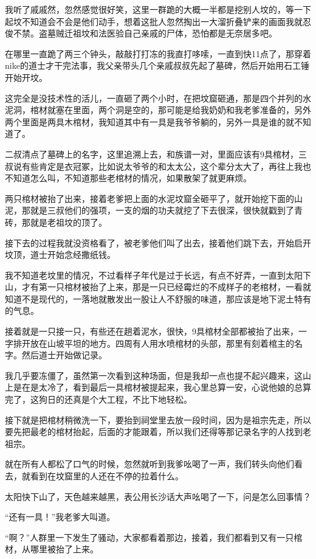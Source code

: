 我听了戚戚然，忽然感觉很好笑，这里一群跪的大概一半都是挖别人坟的，等一下起坟不知道会不会是他们动手，想着这批人忽然掏出一大溜折叠铲来的画面我就忍俊不禁。盗墓贼迁祖坟和法医验自己亲戚的尸体，恐怕都是无奈居多吧。

在哪里一直跪了两三个钟头，敲敲打打冻的我直打哆嗦，一直到快11点了，那穿着nike的道士才干完法事，我父亲带头几个亲戚叔叔先起了墓碑，然后开始用石工锤开始开坟。

这完全是没技术性的活儿，一直砸了两个小时，在把坟窟砸通，那是四个并列的水泥洞，棺材就塞在里面，两个洞是空的，那可能是给我奶奶和我老爹准备的，另外两个里面是两具木棺材，我知道其中有一具是我爷爷躺的，另外一具是谁的就不知道了。

二叔清点了墓碑上的名字，这里追溯上去，和族谱一对，里面应该有9具棺材，三叔说有些肯定是衣冠冢，比如说太爷爷的和太太公，这个辈分太大了，再往上我也不知道怎么叫，不知道那些老棺材的情况，如果散架了就更麻烦。

两只棺材被抬了出来，接着老爹把上面的水泥坟窟全砸平了，就开始挖下面的山泥，那就是三叔他们的强项，一支的烟的功夫就挖了下去很深，很快就戳到了青砖，那就是老祖坟的顶了。

接下去的过程我就没资格看了，被老爹他们叫了出去，接着他们跳下去，开始启开坟顶，道士开始念经撒纸钱。

我不知道老坟里的情况，不过看样子年代是过于长远，有点不好弄，一直到太阳下山，才有第一只棺材被抬了上来，那是一只已经霉烂的不成样子的老棺材，一看就知道不是现代的，一落地就散发出一股让人不舒服的味道，那应该是地下泥土特有的气息。

接着就是一只接一只，有些还在趟着泥水，很快，9具棺材全部都被抬了出来，一字排开放在山坡平坦的地方。四周有人用水喷棺材的头部，那里有刻着棺主的名字。然后道士开始做记录。

我几乎要冻僵了，虽然第一次看到这种场面，但是我却一点也提不起兴趣来，这山上是在是太冷了，看到最后一具棺材被提起来，我心里总算一安，心说他娘的总算完了，这狗日的还真是个大工程，不比下地轻松。

接下就是把棺材稍微洗一下，要抬到祠堂里去放一段时间，因为是祖宗先走，所以要先把最老的棺材抬起，后面的才能跟着，所以我们还得等那记录名字的人找到老祖宗。

就在所有人都松了口气的时候，忽然就听到我爹吆喝了一声，我们转头向他们看去，就看到在坟窟里的人还在不停的拉着什么。

太阳快下山了，天色越来越黑，表公用长沙话大声吆喝了一下，问是怎么回事情？

“还有一具！”我老爹大叫道。

“啊？”人群里一下发生了骚动，大家都看着那边，接着，我们都看到又有一只棺材，从哪里被抬了上来。

